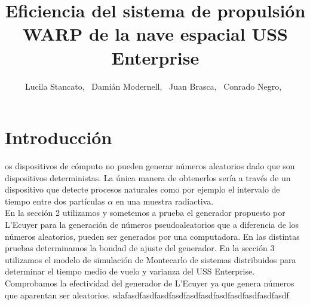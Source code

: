 \documentclass[10pt,journal,compsoc]{IEEEtran}
\begin{document}
\title{Eficiencia del sistema de propulsi\'on WARP de la nave espacial USS Enterprise}


\author{Lucila Stancato,~
		Dami\'an Modernell,~
		Juan Brasca,~
		Conrado Negro,~%

}


\maketitle

\IEEEdisplaynotcompsoctitleabstractindextext

\IEEEpeerreviewmaketitle

\section{Introducci\'on}

os dispositivos de c\'omputo no pueden generar n\'umeros aleatorios dado que 
son dispositivos deterministas. La \'unica manera de obtenerlos ser\'ia a trav\'es de un dispositivo
que detecte procesos naturales como por ejemplo el intervalo de tiempo entre dos part\'iculas $\alpha$
en una muestra radiactiva.\\
En la secci\'on 2 utilizamos y sometemos a prueba el generador propuesto por L'Ecuyer para la
generaci\'on de n\'umeros pseudoaleatorios que a diferencia de los n\'umeros aleatorios, pueden 
ser generados por una computadora. En las distintas pruebas determinamos la bondad de ajuste del
generador. En la secci\'on 3 utilizamos el modelo de simulaci\'on de Montecarlo de sistemas
distribuidos para determinar el tiempo medio de vuelo y varianza del USS Enterprise.\\
Comprobamos la efectividad del generador de L'Ecuyer ya que genera n\'umeros que aparentan ser 
aleatorios.
sdafasdfasdfasdfasdfasdfasdfasdfasdfasdfasdfasdf
\end{document}
